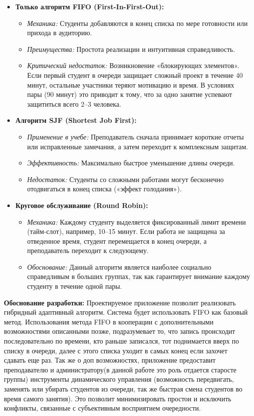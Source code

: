 \begin{itemize}
 \item \textbf{Только алгоритм FIFO (First-In-First-Out):}
 \begin{itemize}
  \item \textit{Механика:} Студенты добавляются в конец списка по мере готовности или прихода в аудиторию.
  \item \textit{Преимущества:} Простота реализации и интуитивная справедливость.
  \item \textit{Критический недостаток:} Возникновение «блокирующих элементов». Если первый студент в 
  очереди защищает сложный проект в течение 40 минут, остальные участники теряют мотивацию и время. 
  В условиях пары (90 минут) это приводит к тому, что за одно занятие успевают защититься всего 2–3 человека.
 \end{itemize}
 
 \item \textbf{Алгоритм SJF (Shortest Job First):}
 \begin{itemize}
  \item \textit{Применение в учебе:} Преподаватель сначала принимает короткие отчеты или исправленные замечания, 
  а затем переходит к комплексным защитам.
  \item \textit{Эффективность:} Максимально быстрое уменьшение длины очереди.
  \item \textit{Недостаток:} Студенты со сложными работами могут бесконечно отодвигаться в конец списка («эффект голодания»).
 \end{itemize}
 
 \item \textbf{Круговое обслуживание (Round Robin):}
 \begin{itemize}
  \item \textit{Механика:} Каждому студенту выделяется фиксированный лимит времени (тайм-слот), например, 
  10–15 минут. Если работа не защищена за отведенное время, студент перемещается в конец очереди, 
  а преподаватель переходит к следующему.
  \item \textit{Обоснование:} Данный алгоритм является наиболее социально справедливым в больших группах, 
  так как гарантирует внимание каждому студенту в течение одной пары.
 \end{itemize}
\end{itemize}

\textbf{Обоснование разработки:} Проектируемое приложение позволит реализовать 
гибридный адаптивный алгоритм. Система будет использовать FIFO как базовый метод.
Использования метода FIFO в кооперации с дополнительными возможностями описанными позже, подразумевает то, что
 запись происходит последовательно по времени, кто раньше записался, тот поднимается вверх по списку в очереди,
 далее с этого списка уходит в самых конец если захочет сдавать еще раз. Так же о доп возможностях, приложение
  предоставит преподавателю и администратору(в данной работе это роль отдается старосте группы) 
инструменты динамического управления (возможность передвигать, заменять или убирать студентов из очереди, 
так же быстрая смена студентов во время самого занятия). Это позволит минимизировать простои и исключить 
конфликты, связанные с субъективным восприятием очередности.

